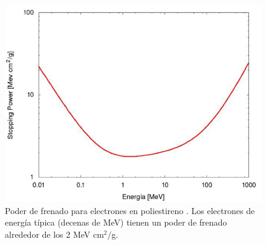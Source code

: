 \documentclass[12pt,oneside,openany,letter]{book}
\begin{document}
\begin{figure}[h!]
    \centering        \includegraphics[scale=0.6]{stopping_e_scint.png}
\caption[Poder de frenado para electrones en poliestireno]{Poder de frenado para electrones en poliestireno \cite{Gonzalez-maestrando2012}. Los electrones de energ\'ia t\'ipica (decenas de MeV) tienen un poder de frenado alrededor de los 2 MeV cm$^2/$g.}\label{stopping_e_scint}
\end{figure}
\end{document}
